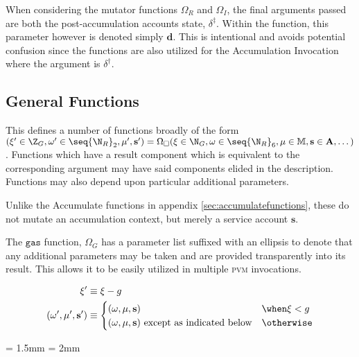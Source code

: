 \nb When considering the mutator functions $\Omega_R$ and $\Omega_I$, the final arguments passed are both the post-accumulation accounts state, $\delta^\ddagger$. Within the function, this parameter however is denoted simply $\mathbf{d}$. This is intentional and avoids potential confusion since the functions are also utilized for the Accumulation Invocation where the argument is $\delta^\dagger$.







\subsection{General Functions}\label{sec:generalfunctions}

This defines a number of functions broadly of the form $(\xi' \in \Z_G, \omega' \in \seq{\N_R}_2, \mu', \mathbf{s}') = \Omega_\square(\xi \in \N_G, \omega \in \seq{\N_R}_6, \mu \in \mathbb{M}, \mathbf{s} \in \mathbf{A}, \dots)$. Functions which have a result component which is equivalent to the corresponding argument may have said components elided in the description. Functions may also depend upon particular additional parameters.

Unlike the Accumulate functions in appendix \ref{sec:accumulatefunctions}, these do not mutate an accumulation context, but merely a service account $\mathbf{s}$.

The $\mathtt{gas}$ function, $\Omega_G$ has a parameter list suffixed with an ellipsis to denote that any additional parameters may be taken and are provided transparently into its result. This allows it to be easily utilized in multiple \textsc{pvm} invocations.

\begin{align}
  \xi' &\equiv \xi - g\\
  (\omega', \mu', \mathbf{s}') &\equiv \begin{cases}
    (\omega, \mu, \mathbf{s}) &\when \xi < g\\
    (\omega, \mu, \mathbf{s}) \text{ except as indicated below} &\otherwise
  \end{cases}
\end{align}

\aboverulesep = 1.5mm \belowrulesep = 2mm

